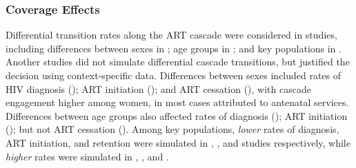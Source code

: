 \subsubsection{Coverage Effects}
\label{sss:res:cov}
Differential transition rates along the ART cascade were considered in
 studies, including differences between
sexes in ;
age groups in ; and
key populations in .
Another  studies did not simulate differential cascade transitions,
but justified the decision using context-specific data.
Differences between sexes included rates of
HIV diagnosis ();
ART initiation (); and
ART cessation (),
with cascade engagement higher among women,
in most cases attributed to antenatal services.
Differences between age groups also affected
rates of diagnosis ();
ART initiation ();
but not ART cessation (). %
Among key populations, \emph{lower} rates of
diagnosis, ART initiation, and retention were simulated in
, , and 
studies respectively, while \emph{higher} rates were simulated in
, , and .
